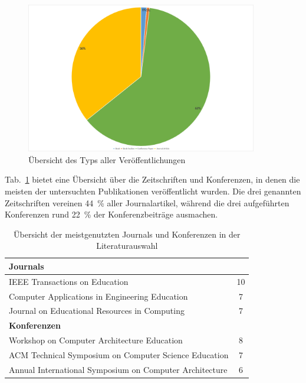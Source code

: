 \begin{figure}[!htbp]
    \centering
    \includegraphics[width=0.90\textwidth]{graphics/2-typ.png}
    \caption{Übersicht des Typs aller Veröffentlichungen}
    \label{fig:2-typ}
\end{figure}

Tab.~\ref{tab:pub-typen} bietet eine Übersicht über die Zeitschriften und Konferenzen, in denen die meisten der untersuchten Publikationen veröffentlicht wurden. Die drei genannten Zeitschriften vereinen 44~\% aller Journalartikel, während die drei aufgeführten Konferenzen rund 22~\% der Konferenzbeiträge ausmachen.

\begin{table}[!htbp]
    \centering
    \caption{Übersicht der meistgenutzten Journals und Konferenzen in der Literaturauswahl}
    \label{tab:pub-typen}
    \tiny
    \begin{tabularx}{\textwidth}{X c}
        \hline
        \multicolumn{2}{l}{\textbf{Journals}} \\
        \hline
        IEEE Transactions on Education & 10 \\
        Computer Applications in Engineering Education & 7 \\
        Journal on Educational Resources in Computing & 7 \\
        \hline
        \multicolumn{2}{l}{\textbf{Konferenzen}} \\
        \hline
        Workshop on Computer Architecture Education & 8 \\
        ACM Technical Symposium on Computer Science Education & 7 \\
        Annual International Symposium on Computer Architecture & 6 \\
        \hline
    \end{tabularx}
\end{table}

